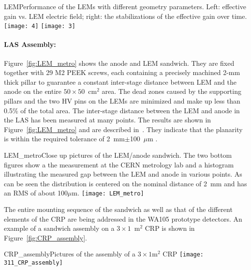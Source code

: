 \begin{cdrfigure}{LEM}{Performance of the LEMs with different geometry parameters. Left: effective gain vs. LEM electric field; right: the stabilizations of the effective gain over time.}
\texttt{[image: 4]}
\texttt{[image: 3]}
\end{cdrfigure}

\paragraph{LAS Assembly:}

Figure~\ref{fig:LEM_metro} shows the anode and LEM sandwich.  They are fixed together with 29 M2 PEEK screws, each containing a precisely machined 2-mm thick pillar to guarantee a constant inter-stage distance between LEM and the anode on the entire $50\times50$~cm$^2$ area.  The dead zones caused by the supporting pillars and the two HV pins on the LEMs are minimized and make up  less than 0.5\% of the total area. The inter-stage distance between the LEM and anode in the LAS has been measured at many points. The results are shown in Figure~\ref{fig:LEM_metro} and are described
in~\cite{EDMS_metro_lem_anode}. They indicate that the planarity is within the required tolerance of 2~mm$\pm$100~$\mu$m .


\begin{cdrfigure}{LEM_metro}{Close up pictures of the LEM/anode sandwich. The two
       bottom figures show a the measurement at the CERN metrology lab
       and a histogram illustrating the measured gap between the LEM
       and anode in various points. As can be seen the distribution is
       centered on the nominal distance of 2~mm and has an RMS of
       about 100$\mu$m.}
     \texttt{[image: LEM\_metro]}
\end{cdrfigure}

The entire mounting sequence of the sandwich as well as that of the different elements of the CRP are being addressed in the WA105
prototype detectors. An example of a sandwich assembly on a $3\times1$~m$^2$ CRP is shown in Figure~\ref{fig:CRP_assembly}.

\begin{cdrfigure}{CRP_assembly}{Pictures of the assembly of a $3\times1$m$^2$ CRP}
     \texttt{[image: 311\_CRP\_assembly]}  
\end{cdrfigure}

